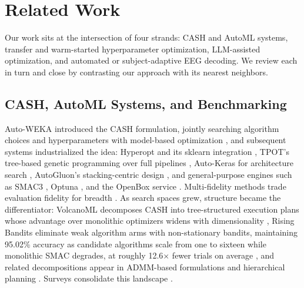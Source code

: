 
\section{Related Work}
\label{sec:related}

Our work sits at the intersection of four strands: CASH and AutoML systems, transfer and warm-started hyperparameter optimization, LLM-assisted optimization, and automated or subject-adaptive EEG decoding. We review each in turn and close by contrasting our approach with its nearest neighbors.

\subsection{CASH, AutoML Systems, and Benchmarking}
\label{sec:related:cash}

Auto-WEKA introduced the CASH formulation, jointly searching algorithm choices and hyperparameters with model-based optimization \cite{KotthoffEtAl2019}, and subsequent systems industrialized the idea: Hyperopt and its sklearn integration \cite{BergstraEtAl2015}, TPOT's tree-based genetic programming over full pipelines \cite{OlsonEtAl2016, OlsonMoore2019}, Auto-Keras for architecture search \cite{JinEtAl2019}, AutoGluon's stacking-centric design \cite{EricksonEtAl2020}, and general-purpose engines such as SMAC3 \cite{LindauerEtAl2021}, Optuna \cite{AkibaEtAl2019}, and the OpenBox service \cite{LiEtAl2021a}. Multi-fidelity methods trade evaluation fidelity for breadth \cite{LiEtAl2016, FalknerEtAl2018, KleinEtAl2016}. As search spaces grew, structure became the differentiator: VolcanoML decomposes CASH into tree-structured execution plans whose advantage over monolithic optimizers widens with dimensionality \cite{LiEtAl2021b, LiEtAl2022a}, Rising Bandits eliminate weak algorithm arms with non-stationary bandits, maintaining 95.02\% accuracy as candidate algorithms scale from one to sixteen while monolithic SMAC degrades, at roughly 12.6$\times$ fewer trials on average \cite{LiEtAl2020a}, and related decompositions appear in ADMM-based formulations \cite{LiuEtAl2019} and hierarchical planning \cite{WeverEtAl2021}. Surveys consolidate this landscape \cite{HutterEtAl2019, ZollerHuber2019, ElshawiEtAl2019, HeEtAl2019, BarbudoEtAl2023}.


